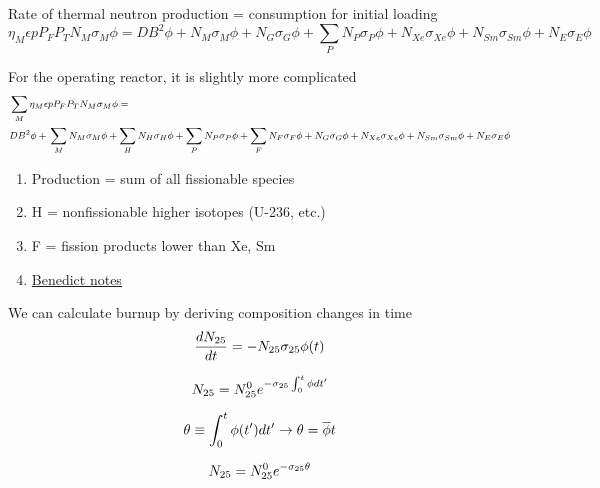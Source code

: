\documentclass[aspectratio=1610,pdftex,dvipsnames,compress,xcolor={dvipsnames}]{beamer}
\begin{document}
\begin{frame}{Rate of thermal neutron production = consumption for initial loading}
    \begin{equation}
        \eta_M \epsilon p P_F P_T N_M \sigma_M \phi = DB^2\phi + N_M\sigma_M\phi + N_G\sigma_G\phi + \sum_P N_P\sigma_P\phi +  N_{Xe}\sigma_{Xe}\phi + N_{Sm}\sigma_{Sm}\phi + N_E\sigma_E\phi
    \end{equation}
\end{frame}


\begin{frame}{For the operating reactor, it is slightly more complicated}
    \begin{equation}
        \footnotesize
        \begin{aligned}
            & \sum_M\eta_M \epsilon p P_F P_T N_M \sigma_M \phi = 
            \\
            & DB^2\phi +  \newline \sum_MN_M\sigma_M\phi +  \sum_HN_H\sigma_H\phi +  \sum_P N_P\sigma_P\phi +  \sum_FN_F\sigma_F\phi +  N_G\sigma_G\phi +  N_{Xe}\sigma_{Xe}\phi +  N_{Sm}\sigma_{Sm}\phi +  N_E\sigma_E\phi
        \end{aligned}
    \end{equation}

    \vspace*{\fill}

    \begin{enumerate}[series=outerlist,topsep=0pt,itemsep=21pt,leftmargin=*,label=(\arabic*)]
        \item[]Production = sum of all fissionable species
        \item[]H = nonfissionable higher isotopes (U-236, etc.)
        \item[]F = fission products lower than Xe, Sm
        \item[]\href{https://piazza.com/class_profile/get_resource/ll13mxo3tb15l/ll1g94jnkby5jr}{Benedict notes}
    \end{enumerate}
\end{frame}


\begin{frame}{We can calculate burnup by deriving composition changes in time}
    \begin{equation}
        \LARGE
        \frac{dN_{25}}{dt}=-N_{25}\sigma_{25}\phi(t)
    \end{equation}
    
    \begin{equation}
        \LARGE
        N_{25}=N_{25}^0e^{-\sigma_{25}\int_0^t\phi dt'}
    \end{equation}
    
    \begin{equation}
        \LARGE
        \theta \equiv \int_0^t\phi(t')dt'\rightarrow \theta = \overline{\phi} t
    \end{equation}

    \begin{equation}
        \LARGE
        N_{25}=N_{25}^0e^{-\sigma_{25}\theta}
    \end{equation}
\end{frame}
\end{document}
